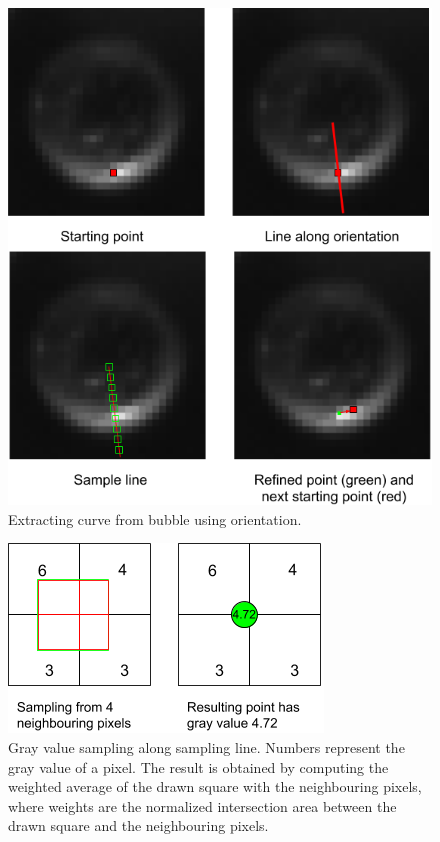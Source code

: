 				 \begin{figure}
				 	\centering
				 	\includegraphics[scale=.5]{images/curve_from_orientation.png}
				 	\caption{Extracting curve from bubble using orientation.}
				 	\label{fig:curve_from_orientation}
				 \end{figure}
				 
				 \begin{figure}
				 	\centering
				 	\includegraphics[scale=.5]{images/subpixel_sampling.png}
				 	\caption{Gray value sampling along sampling line. Numbers represent the gray value of a pixel. The result is obtained by computing the weighted average of the drawn square with the neighbouring pixels, where weights are the normalized intersection area between the drawn square and the neighbouring pixels.}
				 	\label{fig:subpixel_sampling}
				 \end{figure}
				 
